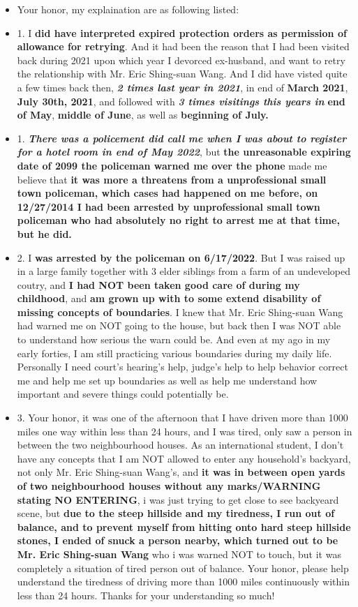 \documentclass[9pt, b5paper]{article}
\begin{document}
\begin{itemize}
\item Your honor, my explaination are as following listed:
\item 1. I \textbf{did have interpreted expired protection orders as permission of allowance for retrying}. And it had been the reason that I had been visited back during 2021 upon which year I devorced ex-husband, and want to retry the relationship with Mr. Eric Shing-suan Wang. And I did have visted quite a few times back then, \emph{\textbf{2 times last year in 2021}}, in end of \textbf{March 2021}, \textbf{July 30th, 2021}, and followed with \emph{\textbf{3 times visitings this years in}} \textbf{end of May}, \textbf{middle of June}, as well as \textbf{beginning of July.}
\item 1. \emph{\textbf{There was a policement did call me when I was about to register for a hotel room in end of May 2022}}, but \textbf{the unreasonable expiring date of 2099 the policeman warned me over the phone} made me believe that \textbf{it was more a threatens from a unprofessional small town policeman, which cases had happened on me before, on 12/27/2014 I had been arrested by unprofessional small town policeman who had absolutely no right to arrest me at that time, but he did.}
\item 2. I \textbf{was arrested by the policeman on 6/17/2022}. But I was raised up in a large family together with 3 elder siblings from a farm of an undeveloped coutry, and \textbf{I had NOT been taken good care of during my childhood}, and \textbf{am grown up with to some extend disability of missing concepts of boundaries}. I knew that Mr. Eric Shing-suan Wang had warned me on NOT going to the house, but back then I was NOT able to understand how serious the warn could be. And even at my ago in my early forties, I am still practicing various boundaries during my daily life. Personally I need court's hearing's help, judge's help to help behavior correct me and help me set up boundaries as well as help me understand how important and severe things could potentially be.
\item 3. Your honor, it was one of the afternoon that I have driven more than 1000 miles one way within less than 24 hours, and I was tired, only saw a person in between the two neighbourhood houses. As an international student, I don't have any concepts that I am NOT allowed to enter any household's backyard, not only Mr. Eric Shing-suan Wang's, and \textbf{it was in between open yards of two neighbourhood houses without any marks/WARNING stating NO ENTERING}, i was just trying to get close to see backyeard scene, but \textbf{due to the steep hillside and my tiredness, I run out of balance, and to prevent myself from hitting onto hard steep hillside stones, I ended of snuck a person nearby, which turned out to be Mr. Eric Shing-suan Wang} who i was warned NOT to touch, but it was completely a situation of tired person out of balance. Your honor, please help understand the tiredness of driving more than 1000 miles continuously within less than 24 hours. Thanks for your understanding so much!

\end{itemize}
\end{document}
